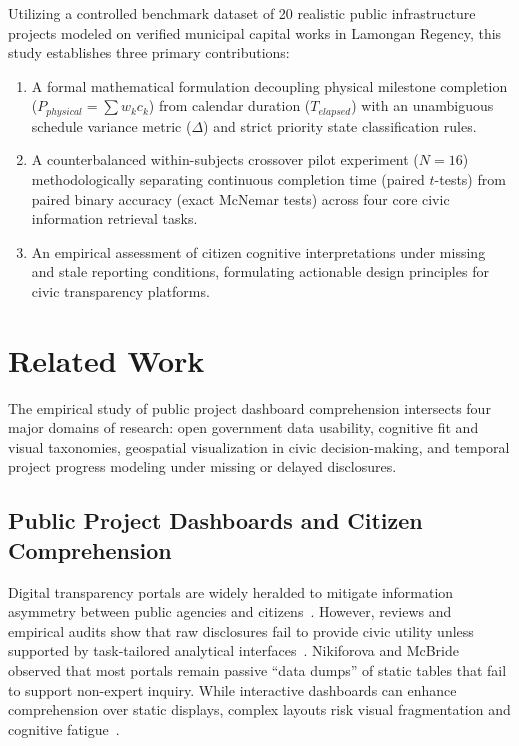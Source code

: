 \documentclass[runningheads]{llncs}
\begin{document}
Utilizing a controlled benchmark dataset of 20 realistic public infrastructure projects modeled on verified municipal capital works in Lamongan Regency, this study establishes three primary contributions:
\begin{enumerate}\setlength{\itemsep}{1.2pt}\setlength{\parskip}{0pt}
    \item A formal mathematical formulation decoupling physical milestone completion ($P_{physical} = \sum w_k c_k$) from calendar duration ($T_{elapsed}$) with an unambiguous schedule variance metric ($\Delta$) and strict priority state classification rules.
    \item A counterbalanced within-subjects crossover pilot experiment ($N = 16$) methodologically separating continuous completion time (paired $t$-tests) from paired binary accuracy (exact McNemar tests) across four core civic information retrieval tasks.
    \item An empirical assessment of citizen cognitive interpretations under missing and stale reporting conditions, formulating actionable design principles for civic transparency platforms.
\end{enumerate}

\section{Related Work}
The empirical study of public project dashboard comprehension intersects four major domains of research: open government data usability, cognitive fit and visual taxonomies, geospatial visualization in civic decision-making, and temporal project progress modeling under missing or delayed disclosures.

\subsection{Public Project Dashboards and Citizen Comprehension}
Digital transparency portals are widely heralded to mitigate information asymmetry between public agencies and citizens~\cite{ansari2022enhancing,chokki2022engaging,kempeneer2023rethinking}. However, reviews and empirical audits show that raw disclosures fail to provide civic utility unless supported by task-tailored analytical interfaces~\cite{ansari2022enhancing,matheus2021design}. Nikiforova and McBride~\cite{nikiforova2021open} observed that most portals remain passive ``data dumps'' of static tables that fail to support non-expert inquiry. While interactive dashboards can enhance comprehension over static displays, complex layouts risk visual fragmentation and cognitive fatigue~\cite{chokki2022engaging,zhao2023digital,kempeneer2023rethinking}.
\end{document}

